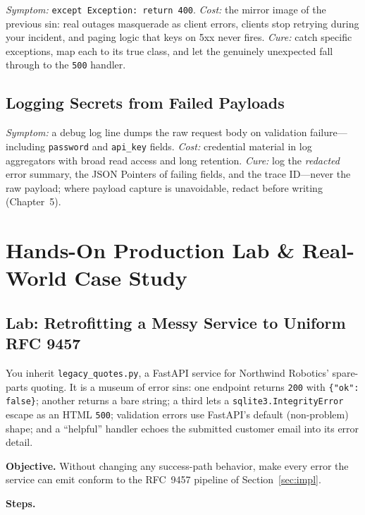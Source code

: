 \emph{Symptom:} \texttt{except Exception: return 400}. \emph{Cost:} the
mirror image of the previous sin: real outages masquerade as client errors,
clients stop retrying during your incident, and paging logic that keys on
5xx never fires. \emph{Cure:} catch specific exceptions, map each to its
true class, and let the genuinely unexpected fall through to the
\texttt{500} handler.

\subsection*{Logging Secrets from Failed Payloads}

\emph{Symptom:} a debug log line dumps the raw request body on validation
failure---including \texttt{password} and \texttt{api\_key} fields.
\emph{Cost:} credential material in log aggregators with broad read access
and long retention. \emph{Cure:} log the \emph{redacted} error summary, the
JSON Pointers of failing fields, and the trace ID---never the raw payload;
where payload capture is unavoidable, redact before writing (Chapter~5).

\section{Hands-On Production Lab \& Real-World Case Study}

\subsection{Lab: Retrofitting a Messy Service to Uniform RFC 9457}

You inherit \texttt{legacy\_quotes.py}, a FastAPI service for Northwind
Robotics' spare-parts quoting. It is a museum of error sins: one endpoint
returns \texttt{200} with \texttt{\{"ok": false\}}; another returns a bare
string; a third lets a \texttt{sqlite3.IntegrityError} escape as an HTML
\texttt{500}; validation errors use FastAPI's default (non-problem) shape;
and a ``helpful'' handler echoes the submitted customer email into its error
detail.

\textbf{Objective.} Without changing any success-path behavior, make every
error the service can emit conform to the RFC~9457 pipeline of
Section~\ref{sec:impl}.

\textbf{Steps.}


